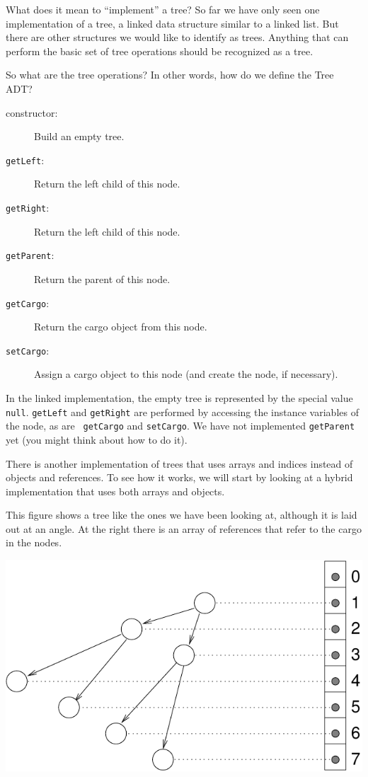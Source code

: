 \documentclass[12pt]{book}
\theoremstyle{exercise}
\begin{document}
What does it mean to ``implement'' a tree?  So far we have only seen
one implementation of a tree, a linked data structure similar to a
linked list.  But there are other structures we would like to identify
as trees.  Anything that can perform the basic set of tree operations
should be recognized as a tree.

So what are the tree operations?  In other words, how do we define
the Tree ADT?

\begin{description}

\item[constructor:]  Build an empty tree.

\item[{\tt getLeft}:]  Return the left child of this node.

\item[{\tt getRight}:]  Return the left child of this node.

\item[{\tt getParent}:]  Return the parent of this node.

\item[{\tt getCargo}:]  Return the cargo object from this node.

\item[{\tt setCargo}:]  Assign a cargo object to this node
(and create the node, if necessary).

\end{description}

In the linked implementation, the empty tree is represented by the
special value {\tt null}.  {\tt getLeft} and {\tt getRight} are
performed by accessing the instance variables of the node, as are {\tt
getCargo} and {\tt setCargo}.  We have not implemented {\tt getParent}
yet (you might think about how to do it).

There is another implementation of trees that uses arrays and
indices instead of objects and references.  To see how it works,
we will start by looking at a hybrid implementation that uses
both arrays and objects.

This figure shows a tree like the ones we have been looking at,
although it is laid out at an angle.
At the right there is an array of
references that refer to the cargo in the nodes.

\includegraphics{figs/tree3.pdf}
\end{document}
